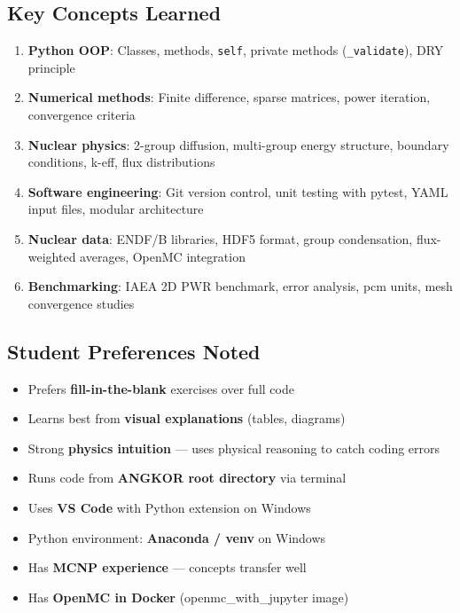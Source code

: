 \documentclass[12pt,a4paper]{article}
\begin{document}
\subsection{Key Concepts Learned}

\begin{enumerate}
    \item \textbf{Python OOP}: Classes, methods, \texttt{self}, private methods
    (\texttt{\_validate}), DRY principle
    \item \textbf{Numerical methods}: Finite difference, sparse matrices,
    power iteration, convergence criteria
    \item \textbf{Nuclear physics}: 2-group diffusion, multi-group energy
    structure, boundary conditions, k-eff, flux distributions
    \item \textbf{Software engineering}: Git version control, unit testing
    with pytest, YAML input files, modular architecture
    \item \textbf{Nuclear data}: ENDF/B libraries, HDF5 format, group
    condensation, flux-weighted averages, OpenMC integration
    \item \textbf{Benchmarking}: IAEA 2D PWR benchmark, error analysis,
    pcm units, mesh convergence studies
\end{enumerate}

\subsection{Student Preferences Noted}

\begin{itemize}
    \item Prefers \textbf{fill-in-the-blank} exercises over full code
    \item Learns best from \textbf{visual explanations} (tables, diagrams)
    \item Strong \textbf{physics intuition} --- uses physical reasoning to
    catch coding errors
    \item Runs code from \textbf{ANGKOR root directory} via terminal
    \item Uses \textbf{VS Code} with Python extension on Windows
    \item Python environment: \textbf{Anaconda / venv} on Windows
    \item Has \textbf{MCNP experience} --- concepts transfer well
    \item Has \textbf{OpenMC in Docker} (openmc\_with\_jupyter image)
\end{itemize}
\end{document}
